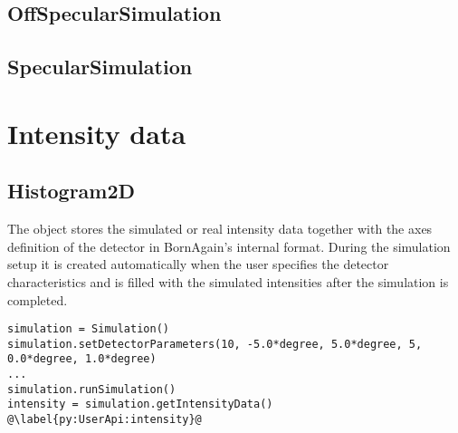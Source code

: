 \subsection{Off\-Specular\-Simulation}

\MissingSection

\subsection{Specular\-Simulation}

\MissingSection

\section{Intensity data}

\MissingSection
\iffalse

\subsection{Histogram2D}\label{SRefHis2D}


The  object stores the
simulated or real intensity data together with the axes definition of the detector in BornAgain's internal format.
During the simulation setup
it is created automatically when the user specifies the detector characteristics and is filled with the simulated intensities after the simulation is completed.

\setPy
\begin{lstlisting}
simulation = Simulation()
simulation.setDetectorParameters(10, -5.0*degree, 5.0*degree, 5, 0.0*degree, 1.0*degree)
...
simulation.runSimulation()
intensity = simulation.getIntensityData() @\label{py:UserApi:intensity}@
\end{lstlisting}

